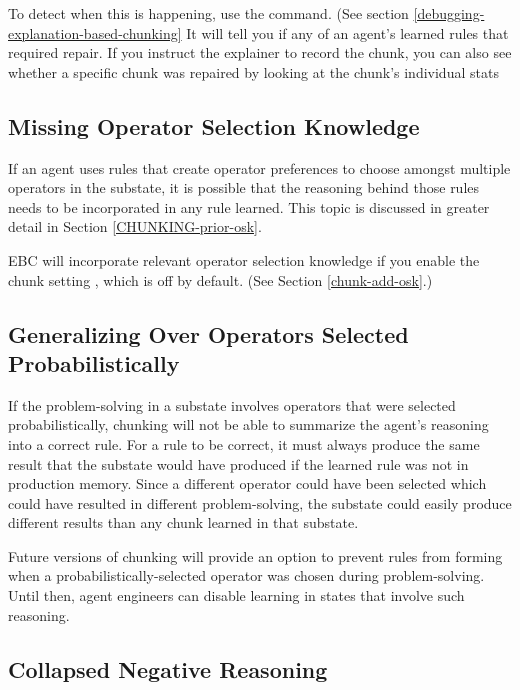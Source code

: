 To detect when this is happening, use the  command. (See section \ref{debugging-explanation-based-chunking} It will tell you if any of an agent's learned rules that required repair.  If you instruct the explainer to record the chunk, you can also see whether a specific chunk was repaired by looking at the chunk's individual stats

\subsection{Missing Operator Selection Knowledge}
\label{CHUNKING-subtleties-missing-osk}

If an agent uses rules that create operator preferences to choose amongst multiple operators in the substate, it is possible that the reasoning behind those rules needs to be incorporated in any rule learned.  This topic is discussed in greater detail in Section \ref{CHUNKING-prior-osk}.

EBC will incorporate relevant operator selection knowledge if you enable the chunk setting , which is off by default. (See Section \ref{chunk-add-osk}.)

\subsection{Generalizing Over Operators Selected Probabilistically}

If the problem-solving in a substate involves operators that were selected probabilistically, chunking will not be able to summarize the agent's reasoning into a correct rule.  For a rule to be correct, it must always produce the same result that the substate would have produced if the learned rule was not in production memory.  Since a different operator could have been selected which could have resulted in different problem-solving, the substate could easily produce different results than any chunk learned in that substate.

Future versions of chunking will provide an option to prevent rules from forming when a probabilistically-selected operator was chosen during problem-solving.  Until then, agent engineers can disable learning in states that involve such reasoning.

\subsection{Collapsed Negative Reasoning}
\label{CHUNKING-subtleties-overgeneralization}

